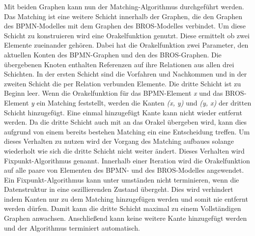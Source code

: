 Mit beiden Graphen kann nun der Matching-Algorithmus durchgeführt werden.
Das Matching ist eine weitere Schicht innerhalb der Graphen, die den Graphen des BPMN-Modelles mit dem Graphen des BROS-Modelles verbindet.
Um diese Schicht zu konstruieren wird eine Orakelfunktion genutzt.
Diese ermittelt ob zwei Elemente zueinander gehören.
Dabei hat die Orakelfunktion zwei Parameter, den aktuellen Konten des BPMN-Graphen und den des BROS-Graphen.
Die übergebenen Knoten enthalten Referenzen auf ihre Relationen aus allen drei Schichten.
In der ersten Schicht sind die Vorfahren und Nachkommen und in der zweiten Schicht die per Relation verbunden Elemente.
Die dritte Schicht ist zu Beginn leer.
Wenn die Orakelfunktion für das BPMN-Element \emph{x} und das BROS-Element \emph{y} ein Matching feststellt, werden die Kanten \emph{(x, y)} und \emph{(y, x)} der dritten Schicht hinzugefügt.
Eine einmal hinzugefügt Kante kann nicht wieder entfernt werden.
Da die dritte Schicht auch mit an das Orakel übergeben wird, kann dies aufgrund von einem bereits bestehen Matching ein eine Entscheidung treffen.
Um dieses Verhalten zu nutzen wird der Vorgang des Matching aufbaues solange wiederholt wie sich die dritte Schicht nicht weiter ändert.
Dieses Verhalten wird Fixpunkt-Algorithmus genannt.
Innerhalb einer Iteration wird die Orakelfunktion auf alle paare von Elementen des BPMN- und des BROS-Modelles angewendet.
Ein Fixpunkt-Algorithmus kann unter umständen nicht terminieren, wenn die Datenstruktur in eine oszillierenden Zustand übergeht.
Dies wird verhindert indem Kanten nur zu dem Matching hinzugefügen werden und somit nie entfernt werden dürfen.
Damit kann die dritte Schicht maximal zu einem Vollständigen Graphen anwachsen.
Anschließend kann keine weitere Kante hinzugefügt werden und der Algorithmus terminiert automatisch.

